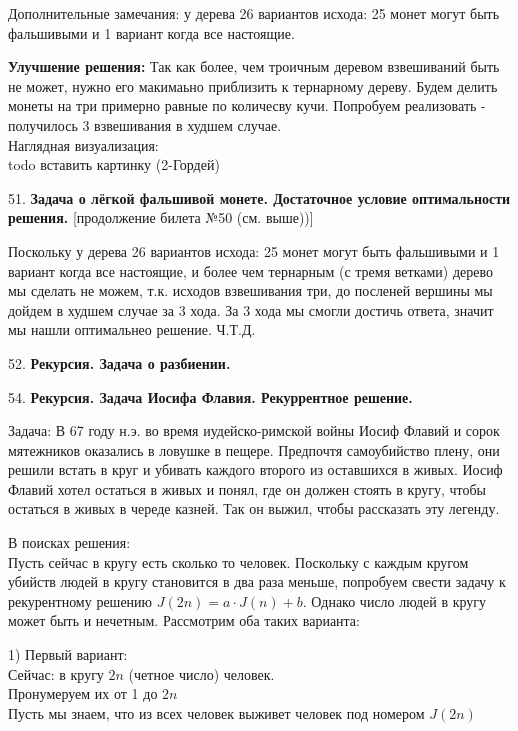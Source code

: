 \documentclass[12pt]{article}
\begin{document}
Дополнительные замечания: у дерева 26 вариантов исхода: 25 монет могут быть фальшивыми и 1 вариант когда все настоящие.

\textbf{Улучшение решения:} Так как более, чем троичным деревом взвешиваний быть не может, нужно его макимаьно приблизить к тернарному дереву. 
Будем делить монеты на три примерно равные по количесву кучи. Попробуем реализовать - получилось 3 взвешивания в худшем случае.\\

Наглядная визуализация:
  \\todo вставить картинку (2-Гордей)



51. \textbf{Задача о лёгкой фальшивой монете. Достаточное условие оптимальности решения.}
[продолжение билета №50 (см. выше))]

Поскольку у дерева 26 вариантов исхода: 25 монет могут быть фальшивыми и 1 вариант когда все настоящие, 
и более чем тернарным (с тремя ветками) дерево мы сделать не можем, т.к. исходов взвешивания три, до посленей вершины мы дойдем в худшем случае за 3 хода. 
За 3 хода мы смогли достичь ответа, значит мы нашли оптимальнео решение. Ч.Т.Д.

52. \textbf{Рекурсия. Задача о разбиении.}

54. \textbf{Рекурсия. Задача Иосифа Флавия. Рекуррентное решение.}

Задача: В 67 году н.э. во время иудейско-римской войны Иосиф Флавий и сорок мятежников оказались в ловушке в пещере. 
Предпочтя самоубийство плену, они решили встать в круг и убивать каждого второго из оставшихся в живых. 
Иосиф Флавий хотел остаться в живых и понял, где он должен стоять в кругу, чтобы остаться в живых в череде казней. 
Так он выжил, чтобы рассказать эту легенду. 

В поисках решения: \\
Пусть сейчас в кругу есть сколько то человек. Поскольку с каждым кругом убийств людей в кругу становится в два раза меньше, попробуем свести задачу к рекурентному решению $J(2n) = a\cdot J(n) + b$. Однако число людей в кругу может быть и нечетным. Рассмотрим оба таких варианта:

1) Первый вариант: \\
Сейчас: в кругу $2n$ (четное число) человек. \\
Пронумеруем их от 1 до $2n$ \\
Пусть мы знаем, что из всех человек выживет человек под номером $J(2n)$ \\
\end{document}
